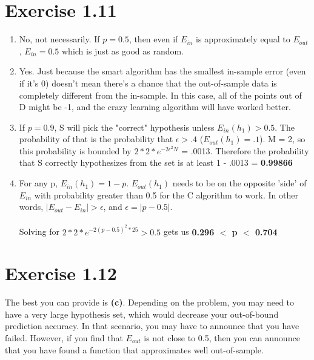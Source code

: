 \documentclass[12pt]{article}
\begin{document}
\section*{Exercise 1.11}
\begin{enumerate}[label=(\alph*)]
	\item No, not necessarily. If $p = 0.5$, then even if $E_{in}$ is approximately equal to $E_{out}$, $E_{in} = 0.5$ which is just as good as random.
	\item Yes. Just because the smart algorithm has the smallest in-sample error (even if it's 0) doesn't mean there's a chance that the out-of-sample data is completely different from the in-sample. In this case, all of the points out of D might be -1, and the crazy learning algorithm will have worked better.
	\item If $p = 0.9$, S will pick the "correct" hypothesis unless $E_{in}(h_1) > 0.5$. The probability of that is the probability that $\epsilon > .4$ ($E_{out}(h_1) = .1$). M = 2, so this probability is bounded by $2 * 2 * e^{-2\epsilon^2N}$ = .0013. Therefore the probability that S correctly hypothesizes from the set is at least 1 - .0013 = \textbf{0.99866}
	\item For any p, $E_{in}(h_1) = 1 - p$. $E_{out}(h_1)$ needs to be on the opposite 'side' of $E_{in}$ with probability greater than 0.5 for the C algorithm to work. In other words, $|E_{out} - E_{in}| > \epsilon$, and $\epsilon = |p - 0.5|$.
	\\ \\ Solving for $2 * 2 * e^{-2(p - 0.5)^2*25} > 0.5$ gets us \textbf{0.296 $<$ p $<$ 0.704}
\end{enumerate}

\section*{Exercise 1.12}
The best you can provide is \textbf{(c)}. Depending on the problem, you may need to have a very large hypothesis set, which would decrease your out-of-bound prediction accuracy. In that scenario, you may have to announce that you have failed. However, if you find that $E_{out}$ is not close to 0.5, then you can announce that you have found a function that approximates well out-of-sample.
\end{document}
